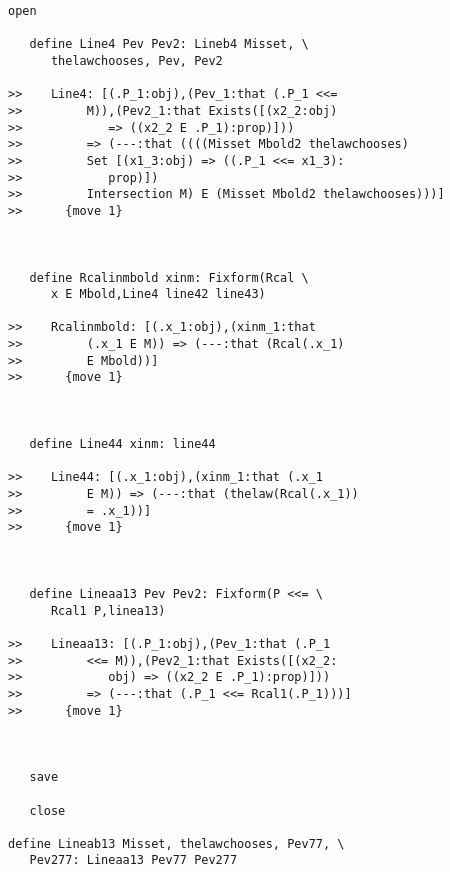 \documentclass[12pt]{article}
\begin{document}
\begin{verbatim}
open

   define Line4 Pev Pev2: Lineb4 Misset, \
      thelawchooses, Pev, Pev2

>>    Line4: [(.P_1:obj),(Pev_1:that (.P_1 <<=
>>         M)),(Pev2_1:that Exists([(x2_2:obj)
>>            => ((x2_2 E .P_1):prop)]))
>>         => (---:that ((((Misset Mbold2 thelawchooses)
>>         Set [(x1_3:obj) => ((.P_1 <<= x1_3):
>>            prop)])
>>         Intersection M) E (Misset Mbold2 thelawchooses)))]
>>      {move 1}



   define Rcalinmbold xinm: Fixform(Rcal \
      x E Mbold,Line4 line42 line43)

>>    Rcalinmbold: [(.x_1:obj),(xinm_1:that
>>         (.x_1 E M)) => (---:that (Rcal(.x_1)
>>         E Mbold))]
>>      {move 1}



   define Line44 xinm: line44

>>    Line44: [(.x_1:obj),(xinm_1:that (.x_1
>>         E M)) => (---:that (thelaw(Rcal(.x_1))
>>         = .x_1))]
>>      {move 1}



   define Lineaa13 Pev Pev2: Fixform(P <<= \
      Rcal1 P,linea13)

>>    Lineaa13: [(.P_1:obj),(Pev_1:that (.P_1
>>         <<= M)),(Pev2_1:that Exists([(x2_2:
>>            obj) => ((x2_2 E .P_1):prop)]))
>>         => (---:that (.P_1 <<= Rcal1(.P_1)))]
>>      {move 1}



   save

   close

define Lineab13 Misset, thelawchooses, Pev77, \
   Pev277: Lineaa13 Pev77 Pev277


\end{verbatim}
\end{document}
